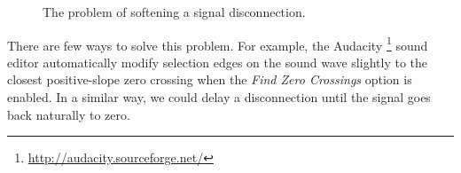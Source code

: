 \begin{figure}[t]
  \centering 

  
  \caption{The problem of softening a signal disconnection.}
\label{fig:soft-port-0}
\end{figure}

There are few ways to solve this problem. For example, the Audacity
\footnote{\url{http://audacity.sourceforge.net/}} sound editor
automatically modify selection edges on the sound wave slightly to the
closest positive-slope zero crossing when the \emph{Find Zero
  Crossings} option is enabled. In a similar way, we could delay a
disconnection until the signal goes back naturally to zero.

